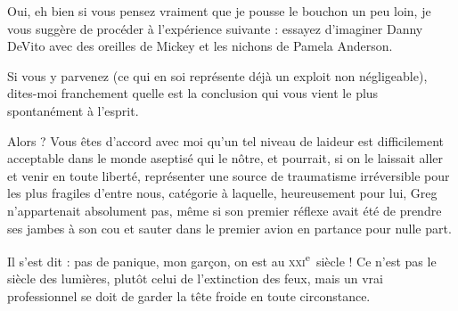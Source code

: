 %
Oui, eh bien si vous pensez vraiment que je pousse le bouchon un peu loin, je vous suggère de procéder à l’expérience suivante : essayez d’imaginer Danny DeVito avec des oreilles de Mickey et les nichons de Pamela Anderson.



Si vous y parvenez (ce qui en soi représente déjà un exploit non négligeable), dites-moi franchement quelle est la conclusion qui vous vient le plus spontanément à l’esprit.

Alors ? Vous êtes d’accord avec moi qu’un tel niveau de laideur est difficilement acceptable dans le monde aseptisé qui le nôtre, et pourrait, si on le laissait aller et venir en toute liberté, représenter une source de traumatisme irréversible pour les plus fragiles d’entre nous, catégorie à laquelle, heureusement pour lui, Greg n’appartenait absolument pas, même si son premier réflexe avait été de prendre ses jambes à son cou et sauter dans le premier avion en partance pour nulle part.

Il s’est dit : pas de panique, mon garçon, on est au \textsc{xxi}\textsuperscript{e}~siècle ! Ce n’est pas le siècle des lumières, plutôt celui de l’extinction des feux, mais un vrai professionnel se doit de garder la tête froide en toute circonstance.

